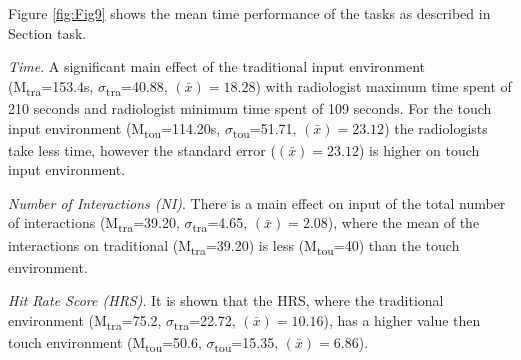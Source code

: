 \documentclass{chi-ext}
\begin{document}

Figure \ref{fig:Fig9} shows the mean time performance of the tasks as described in Section task.

\textit{Time}. A significant main effect of the traditional input environment (M\textsubscript{tra}=153.4s, $\sigma$\textsubscript{tra}=40.88, {}$\left({\bar x}\right)=18.28$) with radiologist maximum time spent of 210 seconds and radiologist minimum time spent of 109 seconds. For the touch input environment (M\textsubscript{tou}=114.20s, $\sigma$\textsubscript{tou}=51.71, {}$\left({\bar x}\right)=23.12$) the radiologists take less time, however the standard error ({}$\left({\bar x}\right)=23.12$) is higher on touch input environment.
  
\textit{Number of Interactions (NI)}.  There is a main effect on input of the total number of interactions (M\textsubscript{tra}=39.20, $\sigma$\textsubscript{tra}=4.65, {}$\left({\bar x}\right)=2.08$), where the mean of the interactions on traditional (M\textsubscript{tra}=39.20) is less  (M\textsubscript{tou}=40) than the touch environment.

\textit{Hit Rate Score (HRS)}. It is shown that the HRS, where the traditional environment (M\textsubscript{tra}=75.2, $\sigma$\textsubscript{tra}=22.72, {}$\left({\bar x}\right)=10.16$), has a higher value then touch environment (M\textsubscript{tou}=50.6, $\sigma$\textsubscript{tou}=15.35, {}$\left({\bar x}\right)=6.86$).
\end{document}
